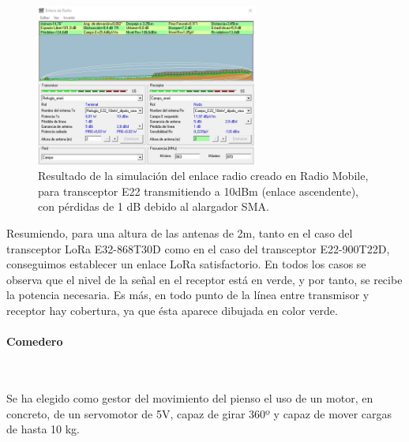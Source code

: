 \documentclass[12pt]{article}
\newcommand{\subsubsubsection}[1]{\paragraph{#1}\mbox{}\\}
\begin{document}
	
	\begin{figure}[h!]
		\begin{center}
			\includegraphics[width=0.65\textwidth]{img/resultado_e22_10mW_conPerdidas_asc.png}
			\caption{Resultado de la simulación del enlace radio creado en Radio Mobile, para transceptor E22 transmitiendo a 10dBm (enlace ascendente), con pérdidas de 1 dB debido al alargador SMA.}
			\label{fig: resultado enlace e22 10mW ascendente con perdidas radio mobile}
		\end{center}
	\end{figure}
	
	\noindent Resumiendo, para una altura de las antenas de 2m, tanto en el caso del transceptor LoRa E32-868T30D como en el caso del transceptor E22-900T22D, conseguimos establecer un enlace LoRa satisfactorio. En todos los casos se observa que el nivel de la señal en el receptor está en verde, y por tanto, se recibe la potencia necesaria. Es más, en todo punto de la línea entre transmisor y receptor hay cobertura, ya que ésta aparece dibujada en color verde.
	
	
	
	
	\subsubsubsection{Comedero}
	\label{subsubsubsection: comedero eleccion}
	
	 \noindent Se ha elegido como gestor del movimiento del pienso el uso de un motor, en concreto, de un servomotor de 5V, capaz de girar 360º y capaz de mover cargas de hasta 10 kg. \\
	
\end{document}
